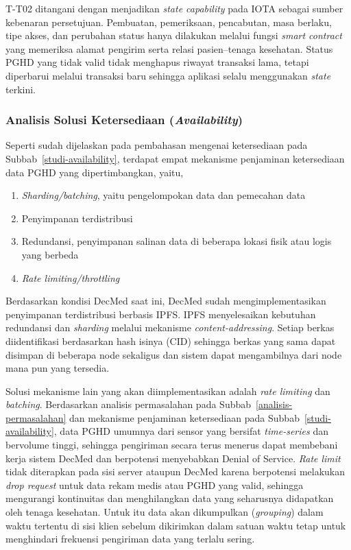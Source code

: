 T-T02 ditangani dengan menjadikan \textit{state capability} pada IOTA sebagai sumber kebenaran persetujuan. 
Pembuatan, pemeriksaan, pencabutan, masa berlaku, tipe akses, dan perubahan status hanya dilakukan melalui fungsi \textit{smart contract} yang memeriksa alamat pengirim serta relasi pasien--tenaga kesehatan. 
Status PGHD yang tidak valid tidak menghapus riwayat transaksi lama, tetapi diperbarui melalui transaksi baru sehingga aplikasi selalu menggunakan \textit{state} terkini.

\subsubsection{Analisis Solusi Ketersediaan (\textit{Availability})}

Seperti sudah dijelaskan pada pembahasan mengenai ketersediaan pada Subbab~\ref{studi-availability}, terdapat empat mekanisme penjaminan ketersediaan data PGHD yang dipertimbangkan, yaitu,

\begin{enumerate}
    \item \textit{Sharding/batching}, yaitu pengelompokan data dan pemecahan data
    
    \item Penyimpanan terdistribusi
    
    \item Redundansi, penyimpanan salinan data di beberapa lokasi fisik atau logis yang berbeda
    
    \item \textit{Rate limiting/throttling}
\end{enumerate}

Berdasarkan kondisi DecMed saat ini, DecMed sudah mengimplementasikan penyimpanan terdistribusi berbasis IPFS\@.
IPFS menyelesaikan kebutuhan redundansi dan \textit{sharding} melalui mekanisme \textit{content-addressing}.
Setiap berkas diidentifikasi berdasarkan hash isinya (CID) sehingga berkas yang sama dapat disimpan di beberapa node sekaligus dan sistem dapat mengambilnya dari node mana pun yang tersedia.

Solusi mekanisme lain yang akan diimplementasikan adalah \textit{rate limiting} dan \textit{batching}.
Berdasarkan analisis permasalahan pada Subbab~\ref{analisis-permasalahan} dan mekanisme penjaminan ketersediaan pada Subbab~\ref{studi-availability}, data PGHD umumnya dari sensor yang bersifat \textit{time-series} dan bervolume tinggi, sehingga pengiriman secara terus menerus dapat membebani kerja sistem DecMed dan berpotensi menyebabkan Denial of Service.
\textit{Rate limit} tidak diterapkan pada sisi server ataupun DecMed karena berpotensi melakukan \textit{drop request} untuk data rekam medis atau PGHD yang valid, sehingga mengurangi kontinuitas dan menghilangkan data yang seharusnya didapatkan oleh tenaga kesehatan.
Untuk itu data akan dikumpulkan (\textit{grouping}) dalam waktu tertentu di sisi klien sebelum dikirimkan dalam satuan waktu tetap untuk menghindari frekuensi pengiriman data yang terlalu sering.

